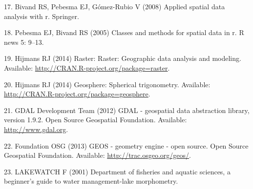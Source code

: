 \documentclass[11pt,]{article}
\begin{document}
\hypertarget{ref-bivand2008applied}{}
17. Bivand RS, Pebesma EJ, Gómez-Rubio V (2008) Applied spatial data
analysis with r. Springer.

\hypertarget{ref-pebesma2005sp}{}
18. Pebesma EJ, Bivand RS (2005) Classes and methods for spatial data in
r. R news 5: 9--13.

\hypertarget{ref-hijmans2014raster}{}
19. Hijmans RJ (2014) Raster: Raster: Geographic data analysis and
modeling. Available: \url{http://CRAN.R-project.org/package=raster}.

\hypertarget{ref-hijmans2014geosphere}{}
20. Hijmans RJ (2014) Geosphere: Spherical trigonometry. Available:
\url{http://CRAN.R-project.org/package=geosphere}.

\hypertarget{ref-GDAL2012}{}
21. GDAL Development Team (2012) GDAL - geospatial data abstraction
library, version 1.9.2. Open Source Geospatial Foundation. Available:
\href{\%20http://www.gdal.org}{http://www.gdal.org}.

\hypertarget{ref-GEOS2013}{}
22. Foundation OSG (2013) GEOS - geometry engine - open source. Open
Source Geospatial Foundation. Available:
\url{http://trac.osgeo.org/geos/}.

\hypertarget{ref-lakewatch2001department}{}
23. LAKEWATCH F (2001) Department of fisheries and aquatic sciences, a
beginner's guide to water management-lake morphometry.
\end{document}
